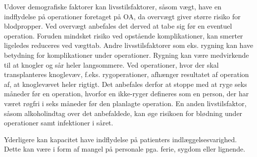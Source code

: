 Udover demografiske faktorer kan livsstilsfaktorer, såsom vægt, have en indflydelse på
operationer foretaget på OA, da overvægt giver større risiko
for blodpropper\cite{Ermonds2004}. Ved overvægt anbefales det derved at tabe sig før
en eventuel operation. Foruden mindsket risiko ved opstående komplikationer, kan
smerter ligeledes reduceres ved vægttab.
Andre livsstilsfaktorer som eks. rygning kan have betydning
for komplikationer under operationer. Rygning kan være medvirkende til at knogler
og sår heler langsommere. Ved operationer, hvor der skal transplanteres knoglevæv, f.eks. rygoperationer, afhænger resultatet af operation af, at knoglevævet heler rigtigt.
Det anbefales derfor at stoppe med at ryge seks måneder før en operation, hvorfor en ikke-ryger defineres som en person, der har været røgfri i seks måneder før den planlagte
operation.\cite{Nordjylland2014} 
En anden livstilsfaktor, såsom alkoholindtag over det anbefaldede, kan øge risikoen for blødning under operationer samt infektioner i såret.\cite{Nordjylland2014}

Yderligere kan kapacitet have indflydelse på patienters indlæggelsesvarighed. Dette kan være i form af mangel på personale pga. ferie, sygdom eller lignende. 



